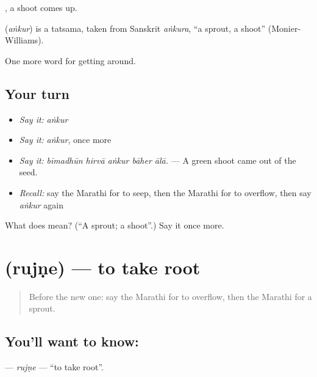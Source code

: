  , a shoot comes up.

\begin{cousinweb}
\textbf{} (\emph{aṅkur}) is a tatsama, taken from Sanskrit \emph{aṅkura}, \textquotedblleft{}a sprout, a shoot\textquotedblright{} (Monier-Williams).
\end{cousinweb}

\begin{grammarlens}[title={What you've built}]
One more word for getting around.
\end{grammarlens}

\subsection*{Your turn}
\begin{itemize}
\raggedright
  \item \emph{Say it:} \emph{aṅkur}
  \item \emph{Say it:} \emph{aṅkur}, once more
  \item \emph{Say it:} \emph{bīmadhūn hirvā aṅkur bāher ālā.} — A green shoot came out of the seed.
  \item \emph{Recall:} say the Marathi for to seep, then the Marathi for to overflow, then say \emph{aṅkur} again
\end{itemize}

\begin{tcolorbox}[breakable,colback=teal!4,colframe=teal!35!black,title={Before you move on}]
What does  mean? (\textquotedblleft{}A sprout; a shoot\textquotedblright{}.) Say it once more.
\end{tcolorbox}
\section[\texorpdfstring{\mr{रुजणे} (rujṇe)}{रुजणे (rujṇe)}]{ (rujṇe) — to take root}

\label{lesson:MR-C445-rujne}



\begin{quote}
Before the new one: say the Marathi for to overflow, then the Marathi for a sprout.
\end{quote}

\subsection*{You'll want to know: }
\textbf{} — \emph{rujṇe} — \textquotedblleft{}to take root\textquotedblright{}.

